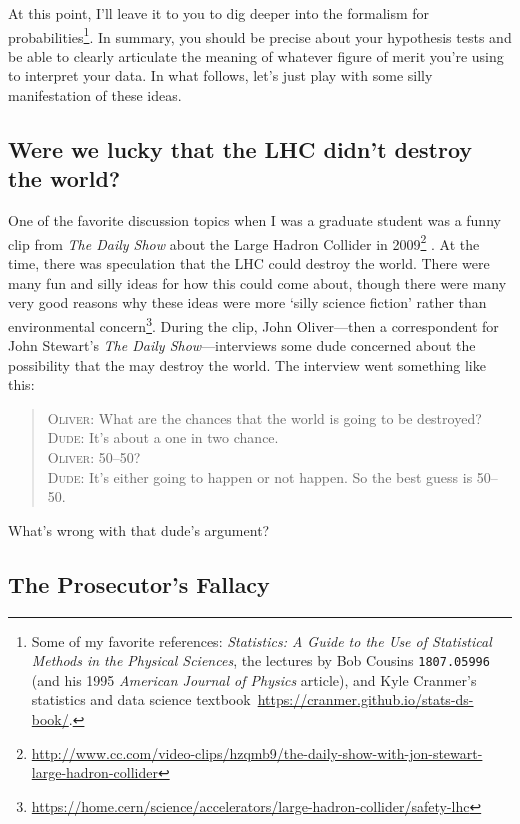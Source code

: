At this point, I'll leave it to you to dig deeper into the formalism for probabilities\footnote{Some of my favorite references: \emph{Statistics: A Guide to the Use of Statistical Methods in the Physical Sciences}, the lectures by Bob Cousins \texttt{1807.05996} (and his 1995 \emph{American Journal of Physics} article), and Kyle Cranmer's statistics and data science textbook~\url{https://cranmer.github.io/stats-ds-book/}.}. In summary, you should be precise about your hypothesis tests and be able to clearly articulate the meaning of whatever figure of merit you're using to interpret your data. In what follows, let's just play with some silly manifestation of these ideas. 

\subsection{Were we lucky that the LHC didn't destroy the world?}
\label{sec:LHC:luck}

One of the favorite discussion topics when I was a graduate student was a funny clip from \emph{The Daily Show} about the Large Hadron Collider in 2009\footnote{\url{http://www.cc.com/video-clips/hzqmb9/the-daily-show-with-jon-stewart-large-hadron-collider}}
. At the time, there was speculation that the LHC could destroy the world. There were many fun and silly ideas for how this could come about, though there were many very good reasons why these ideas were more `silly science fiction' rather than environmental concern\footnote{\url{https://home.cern/science/accelerators/large-hadron-collider/safety-lhc}}. During the clip, John Oliver---then a correspondent for John Stewart's \emph{The Daily Show}---interviews some dude concerned about the possibility that the  may destroy the world. The interview went something like this:
\begin{quote}
\textsc{Oliver}: What are the chances that the world is going to be destroyed?\\
\textsc{Dude}: It's about a one in two chance.\\
\textsc{Oliver}: 50--50?\\
\textsc{Dude}: It's either going to happen or not happen. So the best guess is 50--50.
\end{quote}
\begin{exercise}
What's wrong with that dude's argument?
\end{exercise}
 

\subsection{The Prosecutor's Fallacy}


